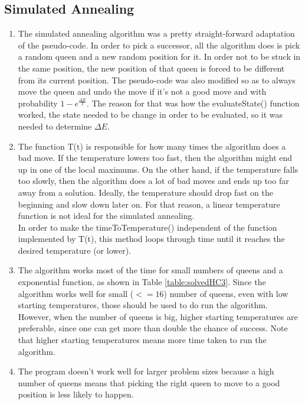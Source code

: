 \documentclass{article}
\begin{document}
\subsection*{Simulated Annealing}
\begin{enumerate}

\item The simulated annealing algorithm was a pretty straight-forward adaptation of the pseudo-code. In order to pick a successor, all the algorithm does is pick a random queen and a new random position for it. In order not to be stuck in the same position, the new position of that queen is forced to be different from its current position. The pseudo-code was also modified so as to always move the queen and undo the move if it's not a good move and with probability $1 - e^{\frac{\Delta E}{T}}$. The reason for that was how the evaluateState() function worked, the state needed to be change in order to be evaluated, so it was needed to determine $\Delta E$.

\item The function T(t) is responsible for how many times the algorithm does a bad move. If the temperature lowers too fast, then the algorithm might end up in one of the local maximums. On the other hand, if the temperature falls too slowly, then the algorithm does a lot of bad moves and ends up too far away from a solution. Ideally, the temperature should drop fast on the beginning and slow down later on. For that reason, a linear temperature function is not ideal for the simulated annealing.\\
In order to make the timeToTemperature() independent of the function implemented by T(t), this method loops through time until it reaches the desired temperature (or lower).

\item The algorithm works most of the time for small numbers of queens and a exponential function, as shown in Table \ref{table:solvedHC3}. Since the algorithm works well for small ($<= 16$) number of queens, even with low starting temperatures, those should be used to do run the algorithm. However, when the number of queens is big, higher starting temperatures are preferable, since one can get more than double the chance of success. Note that higher starting temperatures means more time taken to run the algorithm. 

\item The program doesn't work well for larger problem sizes because a high number of queens means that picking the right queen to move to a good position is less likely to happen. 


\end{enumerate}
\end{document}
